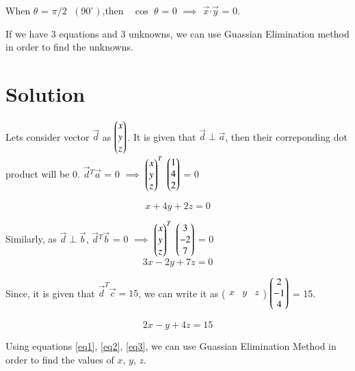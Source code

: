 \documentclass[journal,12pt,twocolumn]{IEEEtran}
\begin{document}
	When $\theta$ = $\pi/2$ $\;$$(90^\circ)$,then $\;$ $\cos$ $\theta$  = 0 $\implies$ $\vec{x}$$\cdot$$\vec{y}$ = 0.
	
	If we have 3 equations and 3 unknowns, we can use Guassian Elimination method in order to find the unknowns.
	
\section{\textbf{Solution}}

	Lets consider vector $\vec{d}$ as $\begin{pmatrix}x\\y\\z\end{pmatrix}$.\hfill \break
	It is given that $\vec{d}\perp\vec{a}$, then their correponding dot product will be 0.\hfill \break
		$\vec{d}$$^{T}$$\vec{a}$ = 0 $\implies$ $\begin{pmatrix}x\\y\\z\end{pmatrix}^ T$ $\begin{pmatrix}1\\4\\2\end{pmatrix}$ = 0 \hfill \break
		

	\begin{equation}\label{eq1}
		x + 4y + 2z = 0
	\end{equation}

	Similarly, as $\vec{d}\perp\vec{b}$, \hfill \break
	$\vec{d}$$^{T}$$\vec{b}$ = 0 $\implies$ $\begin{pmatrix}x\\y\\z\end{pmatrix}^T$ $\begin{pmatrix}3\\-2\\7\end{pmatrix}$ = 0 
	\begin{equation}\label{eq2}
		3x - 2y + 7z = 0
	\end{equation} 

	Since, it is given that $\vec{d}^T\vec{c} = 15$, we can write it as 
	($\begin{matrix}x & y & z\end{matrix}$)  $\begin{pmatrix}2\\-1\\4\end{pmatrix}$ = 15.
	
	\begin{equation}\label{eq3}
		2x - y + 4z = 15
	\end{equation} 
    
    Using equations \ref{eq1}, \ref{eq2}, \ref{eq3}, we can use Guassian Elimination Method in order to find the values of $x$, $y$, $z$.
\end{document}
